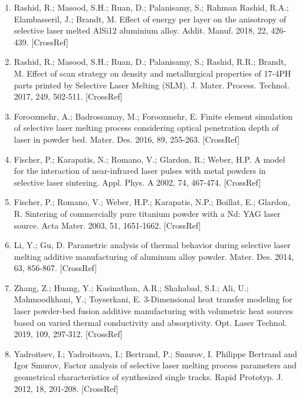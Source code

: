 \documentclass[10pt]{article}
\begin{document}
\begin{enumerate}
  \item Rashid, R.; Masood, S.H.; Ruan, D.; Palanisamy, S.; Rahman Rashid, R.A.; Elambasseril, J.; Brandt, M. Effect of energy per layer on the anisotropy of selective laser melted AlSi12 aluminium alloy. Addit. Manuf. 2018, 22, 426-439. [CrossRef]

  \item Rashid, R.; Masood, S.H.; Ruan, D.; Palanisamy, S.; Rashid, R.R.; Brandt, M. Effect of scan strategy on density and metallurgical properties of 17-4PH parts printed by Selective Laser Melting (SLM). J. Mater. Process. Technol. 2017, 249, 502-511. [CrossRef]

  \item Foroozmehr, A.; Badrossamay, M.; Foroozmehr, E. Finite element simulation of selective laser melting process considering optical penetration depth of laser in powder bed. Mater. Des. 2016, 89, 255-263. [CrossRef]

  \item Fischer, P.; Karapatis, N.; Romano, V.; Glardon, R.; Weber, H.P. A model for the interaction of near-infrared laser pulses with metal powders in selective laser sintering. Appl. Phys. A 2002, 74, 467-474. [CrossRef]

  \item Fischer, P.; Romano, V.; Weber, H.P.; Karapatis, N.P.; Boillat, E.; Glardon, R. Sintering of commercially pure titanium powder with a Nd: YAG laser source. Acta Mater. 2003, 51, 1651-1662. [CrossRef]

  \item Li, Y.; Gu, D. Parametric analysis of thermal behavior during selective laser melting additive manufacturing of aluminum alloy powder. Mater. Des. 2014, 63, 856-867. [CrossRef]

  \item Zhang, Z.; Huang, Y.; Kasinathan, A.R.; Shahabad, S.I.; Ali, U.; Mahmoodkhani, Y.; Toyserkani, E. 3-Dimensional heat transfer modeling for laser powder-bed fusion additive manufacturing with volumetric heat sources based on varied thermal conductivity and absorptivity. Opt. Laser Technol. 2019, 109, 297-312. [CrossRef]

  \item Yadroitsev, I.; Yadroitsava, I.; Bertrand, P.; Smurov, I. Philippe Bertrand and Igor Smurov, Factor analysis of selective laser melting process parameters and geometrical characteristics of synthesized single tracks. Rapid Prototyp. J. 2012, 18, 201-208. [CrossRef]


\end{enumerate}
\end{document}
